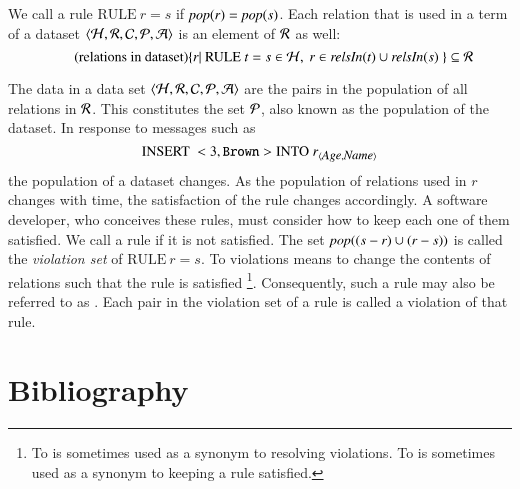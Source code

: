 \documentclass{elsarticle}
\begin{document}
	We call a rule $\text{RULE}\ r = s$  if \(\text{\it pop\/}(r) = \text{\it pop\/}(s)\).
	Each relation that is used in a term of a dataset $\langle\mathcal{H},\mathcal{R},\mathcal{C},\mathcal{P},\mathcal{A}\rangle$ is an element of $\mathcal{R}$ as well:
\begin{equation}
	\tag{relations in dataset}
	\{ r|\ \text{RULE}\ t = s\in\rules,\ r\in\relsIn{t}\cup\relsIn{s}\ \}\subseteq\rels\label{def relations in dataset}
\end{equation}

	The data in a data set $\langle\mathcal{H},\mathcal{R},\mathcal{C},\mathcal{P},\mathcal{A}\rangle$ are the pairs in the population of all relations in $\mathcal{R}$.
	This constitutes the set $\mathcal{P}$, also known as the population of the dataset.
	In response to messages such as
\[\text{INSERT}\ <3,{\tt Brown}> \text{INTO}\ \declare{r}{Age}{Name}\]
 	the population of a dataset changes. 
	As the population of relations used in $r$ changes with time, the satisfaction of the rule changes accordingly.
	A software developer, who conceives these rules, must consider how to keep each one of them satisfied.
	We call a rule  if it is not satisfied.
	The set $\text{\it pop\/}((s-r)\cup(r-s))$ is called the \emph{violation set} of \(\text{RULE}\ r = s\).
	To  violations means to change the contents of relations such that the rule is satisfied%
\footnote{To  is sometimes used as a synonym to resolving violations.
	To  is sometimes used as a synonym to keeping a rule satisfied.}.
	Consequently, such a rule may also be referred to as .
	Each pair in the violation set of a rule is called a violation of that rule.

\section{Bibliography}


\end{document}
